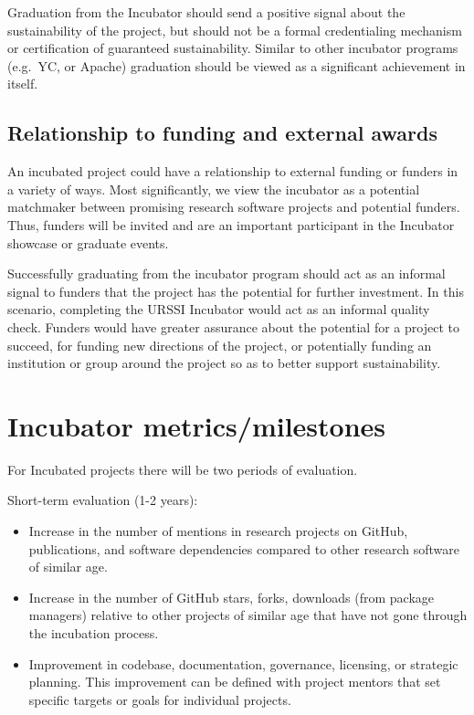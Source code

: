 \documentclass[
]{book}
\providecommand{\tightlist}{%
  \setlength{\itemsep}{0pt}\setlength{\parskip}{0pt}}
\begin{document}
Graduation from the Incubator should send a positive signal about the sustainability of the project, but should not be a formal credentialing mechanism or certification of guaranteed sustainability.
Similar to other incubator programs (e.g.~YC, or Apache) graduation should be viewed as a significant achievement in itself.

\hypertarget{relationship-to-funding-and-external-awards}{%
\subsection{Relationship to funding and external awards}\label{relationship-to-funding-and-external-awards}}

An incubated project could have a relationship to external funding or funders in a variety of ways.
Most significantly, we view the incubator as a potential matchmaker between promising research software projects and potential funders.
Thus, funders will be invited and are an important participant in the Incubator showcase or graduate events.

Successfully graduating from the incubator program should act as an informal signal to funders that the project has the potential for further investment.
In this scenario, completing the URSSI Incubator would act as an informal quality check.
Funders would have greater assurance about the potential for a project to succeed, for funding new directions of the project, or potentially funding an institution or group around the project so as to better support sustainability.

\hypertarget{incubator-metricsmilestones}{%
\section{Incubator metrics/milestones}\label{incubator-metricsmilestones}}

For Incubated projects there will be two periods of evaluation.

Short-term evaluation (1-2 years):

\begin{itemize}
\tightlist
\item
  Increase in the number of mentions in research projects on GitHub, publications, and software dependencies compared to other research software of similar age.
\item
  Increase in the number of GitHub stars, forks, downloads (from package managers) relative to other projects of similar age that have not gone through the incubation process.
\item
  Improvement in codebase, documentation, governance, licensing, or strategic planning. This improvement can be defined with project mentors that set specific targets or goals for individual projects.
\end{itemize}
\end{document}
